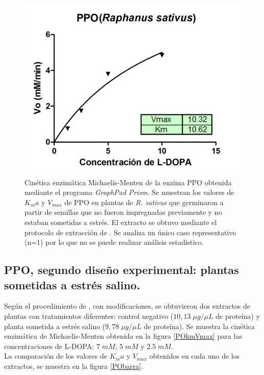 \begin{figure}[hbtp]
	\centering
	\includegraphics[scale=0.9]{Imagenes/POd1}
	\caption{Cin\'etica enzim\'atica Michaelis-Menten de la enzima PPO obtenida mediante el programa \textit{GraphPad Prism}. Se muestran los valores de $K_ma$ y $V_{max}$ de PPO en plantas de \textit{R. sativus} que germinaron a partir de semillas que no fueron impregnadas previamente y no estaban sometidas a estr\'es. El extracto se obtuvo mediante el protocolo de extracci\'on de \citep{liu2010exogenous}. Se analiza un único caso representativo (n=1) por lo que no se puede realizar análisis estadístico.}
	\label{POd1}
\end{figure} 

\pagebreak

\subsection {PPO, segundo dise\~no experimental: plantas sometidas a estr\'es salino.}

Seg\'un el procedimiento de \cite{liu2010exogenous}, con modificaciones, se obtuvieron dos extractos de plantas con tratamientos diferentes: control negativo ($10,13 \;\mu g/ \mu L$ de prote\'ina) y planta sometida a estr\'es salino ($9,78 \;\mu g/ \mu L$ de prote\'ina). Se muestra la cin\'etica enzim\'atica de Michaelis-Menten obtenida en la figura \ref{POkmVmax} para las concentraciones de L-DOPA: $7\;mM$; $5\;mM$ y $2.5\;mM$.\\

La comparaci\'on de los valores de $K_ma$ y $V_{max}$ obtenidos en cada uno de los extractos, se muestra en la figura \ref{PObarra}.\\

